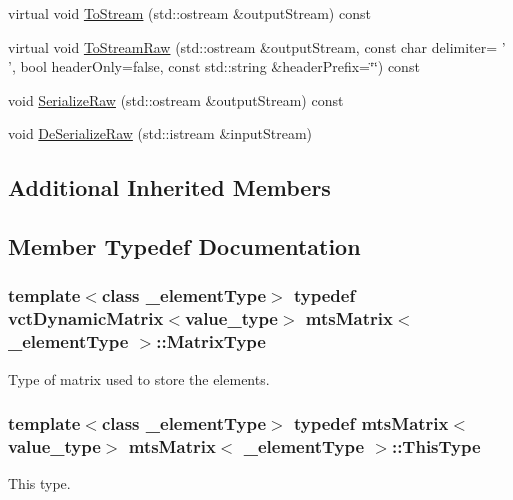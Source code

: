 \begin{DoxyCompactItemize}
virtual void \hyperlink{classmts_matrix_a87c2e010df3ccede587046196fa716fc}{To\-Stream} (std\-::ostream \&output\-Stream) const 
\item 
virtual void \hyperlink{classmts_matrix_a89f5816f6a704ffe48adc00edb8b3ef9}{To\-Stream\-Raw} (std\-::ostream \&output\-Stream, const char delimiter= ' ', bool header\-Only=false, const std\-::string \&header\-Prefix=\char`\"{}\char`\"{}) const 
\item 
void \hyperlink{classmts_matrix_a49484e70fcf5261d86f962c6b1f2ce71}{Serialize\-Raw} (std\-::ostream \&output\-Stream) const 
\item 
void \hyperlink{classmts_matrix_aa079b220e4b5b4578c324a16e02d0eeb}{De\-Serialize\-Raw} (std\-::istream \&input\-Stream)
\end{DoxyCompactItemize}
\subsection*{Additional Inherited Members}


\subsection{Member Typedef Documentation}
\hypertarget{classmts_matrix_af0f57fd565d954a7485dcb26a384d64a}{
\subsubsection[{Matrix\-Type}]{\setlength{\rightskip}{0pt plus 5cm}template$<$class \-\_\-element\-Type$>$ typedef {\bf vct\-Dynamic\-Matrix}$<$value\-\_\-type$>$ {\bf mts\-Matrix}$<$ \-\_\-element\-Type $>$\-::{\bf Matrix\-Type}}}\label{classmts_matrix_af0f57fd565d954a7485dcb26a384d64a}
Type of matrix used to store the elements. \hypertarget{classmts_matrix_abebbde6e54b4a6e574c42a99bc015524}{
\subsubsection[{This\-Type}]{\setlength{\rightskip}{0pt plus 5cm}template$<$class \-\_\-element\-Type$>$ typedef {\bf mts\-Matrix}$<$value\-\_\-type$>$ {\bf mts\-Matrix}$<$ \-\_\-element\-Type $>$\-::{\bf This\-Type}}}\label{classmts_matrix_abebbde6e54b4a6e574c42a99bc015524}
This type. 

